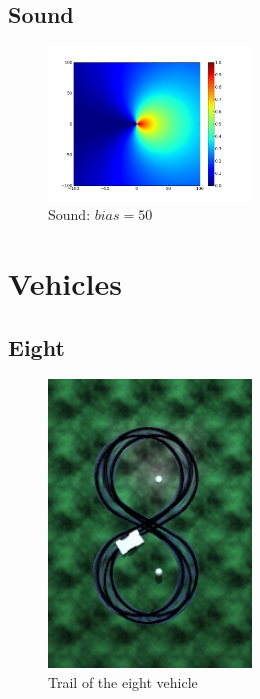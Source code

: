 \documentclass[a4paper]{article}
\begin{document}
\subsection{Sound}
\begin{figure}
	\vspace{-30pt}
	\begin{center}
		\includegraphics[width=0.48\textwidth]{graphs/cardioid.png}
	\end{center}
	\vspace{-30pt}
	\caption{Sound: $bias=50$}
\end{figure}


\cleardoublepage
\section{Vehicles}
\subsection{Eight}
\begin{figure}
	\begin{center}
		\includegraphics[width=0.48\textwidth]{trail/eight.png}
	\end{center}
	\caption{Trail of the eight vehicle}
\end{figure}
\end{document}
